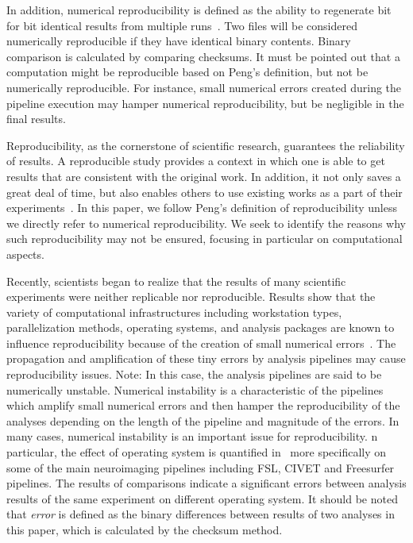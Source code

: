 \documentclass{article}
\newcommand{\note}[2]{\color{blue}Note: #1\color{black}}
\begin{document}
{In addition, numerical reproducibility is defined as the ability to 
regenerate bit for bit identical results from multiple 
runs~\cite{hill2017numerical}. Two files will be considered numerically 
reproducible if they have identical binary contents. Binary 
comparison is calculated by comparing checksums. It must be pointed out 
that a computation might be reproducible based on Peng's definition, 
but not be numerically reproducible. For instance, small numerical 
errors created during the pipeline execution may hamper numerical 
reproducibility, but be negligible in the final results.

Reproducibility, as the cornerstone of scientific research, guarantees 
the reliability of results. A reproducible study provides a context in 
which one is able to get results that are consistent with the original 
work. In addition, it not only saves a great deal of time, but also 
enables others to use existing works as a part of their 
experiments~\cite{plesser2018reproducibility}. 
In this paper, we follow Peng's definition of reproducibility 
unless we directly refer to numerical reproducibility. 
We seek to identify the reasons why such reproducibility may not be 
ensured, focusing in particular on computational aspects.

Recently, scientists began to realize that the results of many 
scientific experiments were neither replicable nor reproducible. 
Results show that the variety of computational infrastructures 
including workstation types, parallelization methods, operating 
systems, and analysis packages are known to influence reproducibility 
because of the creation of small numerical 
errors~\cite{Gronenschild2012, diethelm2012limits, Glatard2015}. The 
propagation and amplification of these tiny errors by analysis 
pipelines may cause reproducibility issues. 
\note{In this case, the analysis pipelines are said to be numerically 
unstable. Numerical instability is a characteristic of the pipelines 
which amplify small numerical errors and then hamper the 
reproducibility of the analyses depending on the length of the pipeline 
and magnitude of the errors. In many cases, numerical instability is an 
important issue for reproducibility. }
In particular, the effect of operating system is quantified 
in~\cite{Glatard2015, Gronenschild2012} more specifically on some of 
the main neuroimaging pipelines including FSL, CIVET and Freesurfer 
pipelines. The results of comparisons indicate a significant errors 
between analysis results of the same experiment on different operating 
system. It should be noted that \emph{error} is defined as the binary 
differences between results of two analyses in this paper, which is 
calculated by the checksum method. 

}
\end{document}
